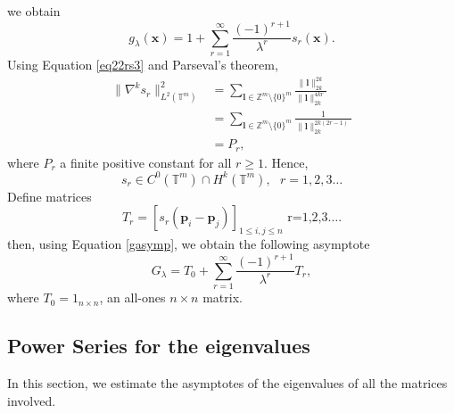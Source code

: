 \documentclass[multixcb]{amstext-l}
\theoremstyle{plain}
\theoremstyle{definition}
\theoremstyle{definition}
\theoremstyle{remark}
\numberwithin{equation}{chapter}
\begin{document}
we obtain \begin{equation}\label{gasymp}
g_{\lambda}(\boldsymbol{x}) = 1 + \sum\limits_{r=1}^{\infty}\frac{(-1)^{r+1}}{\lambda^r}s_r(\boldsymbol{x}).
\end{equation}
 Using Equation \ref{eq22rs3} and Parseval's theorem, 
 \begin{equation}\label{prs_sr}
 \begin{aligned}
 \|\nabla^k s_r\|^2_{L^2(\mathbb{T}^m)}  &= \sum\limits_{\boldsymbol{l}\in\mathbb{Z}^m\setminus\{0\}^m}\frac{\|\boldsymbol{l}\|^{2k}_{2k}}{\|\boldsymbol{l}\|^{4kr}_{2k}}\\
 &= \sum\limits_{\boldsymbol{l}\in\mathbb{Z}^m\setminus\{0\}^m}\frac{1}{\|\boldsymbol{l}\|^{2k(2r-1)}_{2k}}\\
 &= P_r,
  \end{aligned}
 \end{equation}
where $P_r$ a finite positive constant for all $r\ge 1$. Hence,  $$s_r\in C^0(\mathbb{T}^m)\cap H^k(\mathbb{T}^m),\mbox{          }r=1,2,3\ldots$$
Define matrices $$T_r = [s_r(\boldsymbol{p}_i-\boldsymbol{p}_j)]_{1\le i,j\le n}\mbox{   r=1,2,3\ldots}.$$ then, using Equation \ref{gasymp}, we obtain the following asymptote \begin{equation}\label{Gasymp}
G_{\lambda} = T_0 + \sum\limits_{r=1}^{\infty}\frac{(-1)^{r+1}}{\lambda^r}T_r,    
\end{equation} 
where $T_0 = 1_{n\times n}$, an all-ones $n \times n$ matrix.

\subsection{Power Series for the eigenvalues} In this section, we estimate the asymptotes of the eigenvalues of all the matrices involved.
\end{document}
